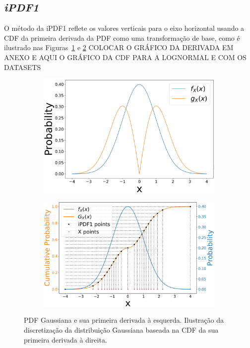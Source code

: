 \subsection{\textit{iPDF1}}

O método da \ac{iPDF1} reflete os valores verticais para o eixo horizontal usando a \ac{CDF} da primeira derivada da \ac{PDF} como uma transformação de base, como é ilustrado nas Figuras~\ref{fig:dPDF1} e \ref{fig:dPDF2}
{\color{red} COLOCAR O GRÁFICO DA DERIVADA EM ANEXO E AQUI O GRÁFICO DA CDF PARA A LOGNORMAL E COM OS DATASETS}
\begin{figure}[!ht]
	\centering
	\begin{subfigure}[b]{0.44\textwidth}
		\centering 
		\includegraphics[width=\textwidth]{./figuras/dpdf1}
		\caption{}
		\label{fig:dPDF1}
	\end{subfigure}
	\hfill
	\begin{subfigure}[b]{0.47\textwidth}
		\centering 
		\includegraphics[width=\textwidth]{./figuras/dpdf2}
		\caption{}
		\label{fig:dPDF2}
	\end{subfigure}
\caption{PDF Gaussiana e sua primeira derivada à esquerda. Ilustração da discretização da distribuição Gaussiana baseada na CDF da sua primeira derivada à direita.}
\label{fig:dPDF}
\end{figure}

